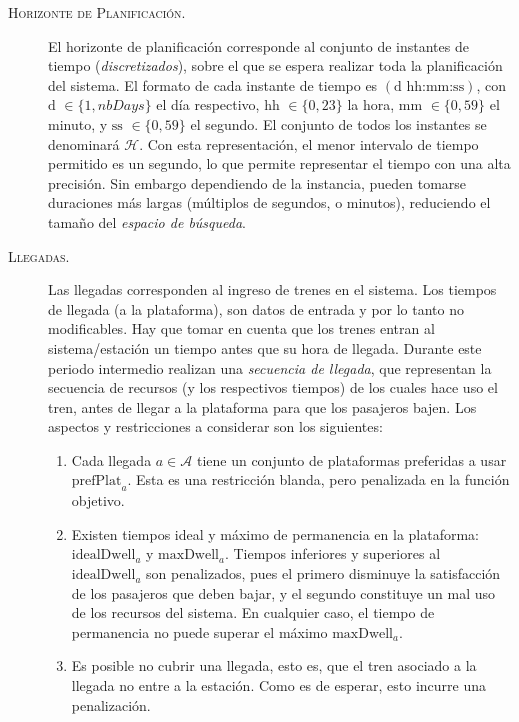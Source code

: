 \documentclass[letter, 10pt]{article}
\begin{document}
\begin{description}
    \item[\textsc{Horizonte de Planificación.}]
    El horizonte de planificación corresponde al conjunto de instantes de tiempo (\textit{discretizados}),
    sobre el que se espera realizar toda la planificación del sistema. El formato de cada instante de tiempo
    es $(\text{d hh:mm:ss})$, con $\text{d } \in \{1, nbDays\}$ el día respectivo, $\text{hh } \in \{0,23\}$
    la hora, $\text{mm } \in \{0,59\}$ el minuto, y $\text{ss } \in \{0,59\}$ el segundo. El conjunto de todos
    los instantes se denominará $\mathcal{H}$. Con esta representación, el menor intervalo de tiempo permitido
    es un segundo, lo que permite representar el tiempo con una alta precisión. Sin embargo dependiendo de la
    instancia, pueden tomarse duraciones más largas (múltiplos de segundos, o minutos), reduciendo el tamaño del
    \textit{espacio de búsqueda}.

    \item[\textsc{Llegadas.}]
    Las llegadas corresponden al ingreso de trenes en el sistema. Los tiempos de llegada (a la plataforma),
    son datos de entrada y por lo tanto no modificables. Hay que tomar en cuenta que los trenes entran al
    sistema/estación un tiempo antes que su hora de llegada. Durante este periodo intermedio realizan una
    \textit{secuencia de llegada}, que representan la secuencia de recursos (y los respectivos tiempos) de
    los cuales hace uso el tren, antes de llegar a la plataforma para que los pasajeros bajen. Los aspectos
    y restricciones a considerar son los siguientes:
    \begin{enumerate}
        \item Cada llegada $a \in \mathcal{A}$ tiene un conjunto de plataformas preferidas a usar $\text{prefPlat}_a$.
         Esta es una restricción blanda, pero penalizada en la función objetivo.
        \item Existen tiempos ideal y máximo de permanencia en la plataforma: $\text{idealDwell}_a$ y $\text{maxDwell}_a$.
        Tiempos inferiores y superiores al $\text{idealDwell}_a$ son penalizados, pues el primero disminuye la satisfacción
        de los pasajeros que deben bajar, y el segundo constituye un mal uso de los recursos del sistema. En cualquier caso,
        el tiempo de permanencia no puede superar el máximo $\text{maxDwell}_a$.
        \item Es posible no cubrir una llegada, esto es, que el tren asociado a la llegada no entre a la estación. Como es de esperar, esto incurre una penalización.
    \end{enumerate}


\end{description}
\end{document}
